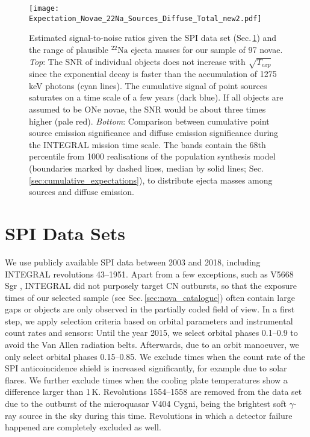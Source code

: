 \documentclass{aa}
\newcommand{\mrm}[1]{\mathrm{#1}}
\newcommand{\nuc}[2]{$\mrm{^{#2}#1}$}
\begin{document}
\begin{figure}[!th]
	\centering
	\texttt{[image: Expectation\_Novae\_22Na\_Sources\_Diffuse\_Total\_new2.pdf]}
	\caption{Estimated signal-to-noise ratios given the SPI data set (Sec.\,\ref{sec:data_sets}) and the range of plausible \nuc{Na}{22} ejecta masses for our sample of 97 novae. \textit{Top}: The SNR of individual objects does not increase with $\sqrt{T_{exp}}$ since the exponential decay is faster than the accumulation of 1275\,keV photons (cyan lines). The cumulative signal of point sources saturates on a time scale of a few years (dark blue). If all objects are assumed to be ONe novae, the SNR would be about three times higher (pale red). \textit{Bottom}: Comparison between cumulative point source emission significance and diffuse emission significance during the INTEGRAL mission time scale. The bands contain the 68th percentile from 1000 realisations of the population synthesis model (boundaries marked by dashed lines, median by solid lines; Sec.\,\ref{sec:cumulative_expectations}), to distribute ejecta masses among sources and diffuse emission.}
	\label{fig:SNR_estimates}
\end{figure}

\section{SPI Data Sets}\label{sec:data_sets}

We use publicly available SPI data between 2003 and 2018, including INTEGRAL revolutions 43--1951.
%
Apart from a few exceptions, such as V5668 Sgr \citep{Siegert2018_V5668Sgr}, INTEGRAL did not purposely target CN outbursts, so that the exposure times of our selected sample (see Sec.\,\ref{sec:nova_catalogue}) often contain large gaps or objects are only observed in the partially coded field of view.
%
In a first step, we apply selection criteria based on orbital parameters and instrumental count rates and sensors:
%
Until the year 2015, we select orbital phases 0.1--0.9 to avoid the Van Allen radiation belts.
%
Afterwards, due to an orbit manoeuver, we only select orbital phases 0.15--0.85.
%
We exclude times when the count rate of the SPI anticoincidence shield is increased significantly, for example due to solar flares.
%
We further exclude times when the cooling plate temperatures show a difference larger than 1\,K.
%
Revolutions 1554--1558 are removed from the data set due to the outburst of the microquasar V404 Cygni, being the brightest soft $\gamma$-ray source in the sky during this time.
%
Revolutions in which a detector failure happened are completely excluded as well.
\end{document}
